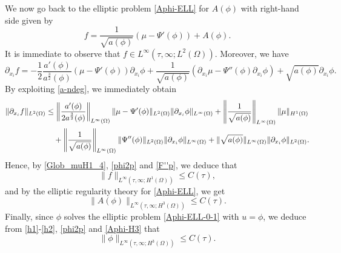 \documentclass[11pt,reqno]{amsart}
\theoremstyle{remark}
\numberwithin{equation}{section}
\begin{document}
\smallskip
We now go back to the elliptic problem \eqref{Aphi-ELL} for $A(\phi)$ with right-hand side given by
$$
f= \frac{1}{\sqrt{a(\phi)}} \left( \mu- \Psi'(\phi) \right) + A(\phi).
$$
It is immediate to observe that $f \in L^\infty(\tau,\infty; L^2(\Omega))$. Moreover, we have
$$
\partial_{x_i}f = - \frac12
\frac{a'(\phi)}{a^\frac32(\phi)}  \left( \mu- \Psi'(\phi) \right) \partial_{x_i} \phi
+
\frac{1}{\sqrt{a(\phi)}} \left( \partial_{x_i} \mu- \Psi''(\phi) \partial_{x_i} \phi\right) + \sqrt{a(\phi)} \partial_{x_i} \phi.
$$
By exploiting \eqref{a-ndeg}, we immediately obtain
\begin{align}
\|\partial_{x_i}f  \|_{L^2(\Omega)}
& \leq
\left\| 
\frac{a'(\phi)}{2a^\frac32(\phi)} \right\|_{L^\infty(\Omega)} \| \mu- \Psi'(\phi)\|_{L^2(\Omega)} \| \partial_{x_i} \phi\|_{L^\infty(\Omega)}
+ \left\| \frac{1}{\sqrt{a(\phi)}}\right\|_{L^\infty(\Omega)} \| \mu\|_{H^1(\Omega)}
\notag \\
&\quad +  \left\| \frac{1}{\sqrt{a(\phi)}}\right\|_{L^\infty(\Omega)}  \| \Psi''(\phi)\|_{L^2(\Omega)} \| \partial_{x_i} \phi\|_{L^\infty(\Omega)} 
+ \| \sqrt{a(\phi)}\|_{L^\infty(\Omega)} \| \partial_{x_i} \phi\|_{L^2(\Omega)}.
\label{fdeltai}
\end{align}
Hence, by \eqref{Glob_muH1_4}, \eqref{phi2p} and \eqref{F''p}, we deduce that
$$
\| f \|_{L^\infty(\tau,\infty; H^1(\Omega))}\leq C(\tau),
$$
and by the elliptic regularity theory for \eqref{Aphi-ELL}, we get
\begin{equation}
\label{Aphi-H3}
\| A(\phi) \|_{L^\infty( \tau,\infty; H^3(\Omega))} \leq C(\tau).
\end{equation}
Finally, since $\phi$ solves the elliptic problem \eqref{Aphi-ELL-0-1} with $u=\phi$, we deduce from \eqref{h1}-\eqref{h2}, \eqref{phi2p} and \eqref{Aphi-H3} that
\begin{equation*}
\| \phi\|_{L^\infty(\tau,\infty; H^3(\Omega))}\leq C(\tau).
\end{equation*}
\end{document}
